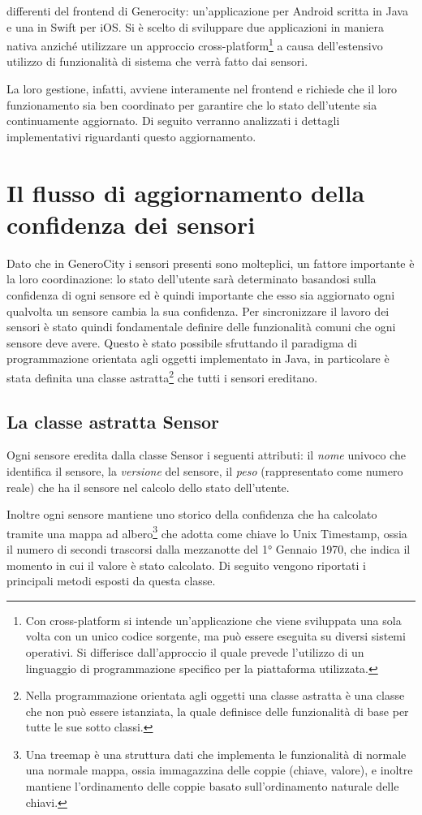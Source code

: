 differenti del frontend di Generocity: un'applicazione per Android scritta in Java e una in Swift per iOS. Si è scelto di sviluppare due applicazioni in maniera nativa anziché utilizzare un approccio cross-platform\footnote{Con cross-platform si intende un'applicazione che viene sviluppata una sola volta con un unico codice sorgente, ma può essere eseguita su diversi sistemi operativi. Si differisce dall'approccio il quale prevede l'utilizzo di un linguaggio di programmazione specifico per la piattaforma utilizzata.} a causa dell'estensivo utilizzo di funzionalità di sistema che verrà fatto dai sensori.

La loro gestione, infatti,  avviene interamente nel frontend e richiede che il loro funzionamento sia ben coordinato per garantire che lo stato dell'utente sia continuamente aggiornato. Di seguito verranno analizzati i dettagli implementativi riguardanti questo aggiornamento.


\section{Il flusso di aggiornamento della confidenza dei sensori}
Dato che in GeneroCity i sensori presenti sono molteplici, un fattore importante è la loro coordinazione: lo stato dell'utente sarà determinato basandosi sulla confidenza di ogni sensore ed è quindi importante che esso sia aggiornato ogni qualvolta un sensore cambia la sua confidenza. Per sincronizzare il lavoro dei sensori è stato quindi fondamentale definire delle funzionalità comuni che ogni sensore deve avere. Questo è stato possibile sfruttando il paradigma di programmazione orientata agli oggetti implementato in Java, in particolare è stata definita una classe astratta\footnote{Nella programmazione orientata agli oggetti una classe astratta è una classe che non può essere istanziata, la quale definisce delle funzionalità di base per tutte le sue sotto classi.} che tutti i sensori ereditano.

\subsection{La classe astratta Sensor}\label{ref:sensor}
Ogni sensore eredita dalla classe Sensor i seguenti attributi: il \textit{nome} univoco che identifica il sensore, la \textit{versione} del sensore, il \textit{peso} (rappresentato come numero reale) che ha il sensore nel calcolo dello stato dell'utente.

Inoltre ogni sensore mantiene uno storico della confidenza che ha calcolato tramite una mappa ad albero\footnote{Una treemap è una struttura dati che implementa le funzionalità di normale una normale mappa, ossia immagazzina delle coppie (chiave, valore), e inoltre mantiene l'ordinamento delle coppie basato sull'ordinamento naturale delle chiavi.} che adotta come chiave lo Unix Timestamp, ossia il numero di secondi trascorsi dalla mezzanotte del 1° Gennaio 1970, che indica il momento in cui il valore è stato calcolato. Di seguito vengono riportati i principali metodi esposti da questa classe.
